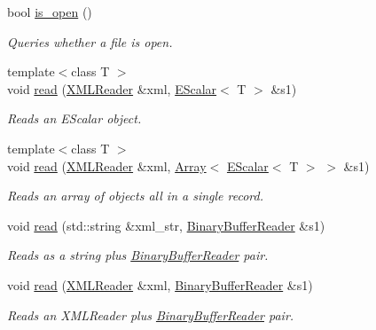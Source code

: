 \begin{DoxyCompactItemize}
bool \mbox{\hyperlink{group__qio_ga601972c66a6e6671d7b41ee1bce80e82}{is\+\_\+open}} ()
\begin{DoxyCompactList}\small\item\em Queries whether a file is open. \end{DoxyCompactList}\item 
{\footnotesize template$<$class T $>$ }\\void \mbox{\hyperlink{group__qio_gac92ce1b0fee7c00b8a7dc988f3d4906e}{read}} (\mbox{\hyperlink{classADATXML_1_1XMLReader}{X\+M\+L\+Reader}} \&xml, \mbox{\hyperlink{classENSEM_1_1EScalar}{E\+Scalar}}$<$ T $>$ \&s1)
\begin{DoxyCompactList}\small\item\em Reads an E\+Scalar object. \end{DoxyCompactList}\item 
{\footnotesize template$<$class T $>$ }\\void \mbox{\hyperlink{group__qio_ga32969d6bfdfe9da2912e92d1f0871c20}{read}} (\mbox{\hyperlink{classADATXML_1_1XMLReader}{X\+M\+L\+Reader}} \&xml, \mbox{\hyperlink{classXMLArray_1_1Array}{Array}}$<$ \mbox{\hyperlink{classENSEM_1_1EScalar}{E\+Scalar}}$<$ T $>$ $>$ \&s1)
\begin{DoxyCompactList}\small\item\em Reads an array of objects all in a single record. \end{DoxyCompactList}\item 
void \mbox{\hyperlink{group__qio_ga2179348a566e0224ed2122acfabf8bc9}{read}} (std\+::string \&xml\+\_\+str, \mbox{\hyperlink{classADATIO_1_1BinaryBufferReader}{Binary\+Buffer\+Reader}} \&s1)
\begin{DoxyCompactList}\small\item\em Reads as a string plus \mbox{\hyperlink{classADATIO_1_1BinaryBufferReader}{Binary\+Buffer\+Reader}} pair. \end{DoxyCompactList}\item 
void \mbox{\hyperlink{group__qio_gadf1e0b4405e14798a0610efd8774f8d0}{read}} (\mbox{\hyperlink{classADATXML_1_1XMLReader}{X\+M\+L\+Reader}} \&xml, \mbox{\hyperlink{classADATIO_1_1BinaryBufferReader}{Binary\+Buffer\+Reader}} \&s1)
\begin{DoxyCompactList}\small\item\em Reads an X\+M\+L\+Reader plus \mbox{\hyperlink{classADATIO_1_1BinaryBufferReader}{Binary\+Buffer\+Reader}} pair. \end{DoxyCompactList}\item 

\end{DoxyCompactItemize}
